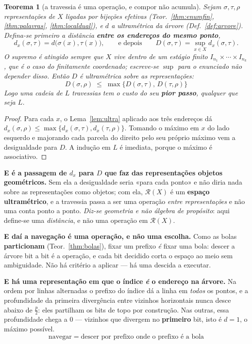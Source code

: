 \documentclass[11pt,a4paper]{article}
\newtheorem{teorema}{Teorema}
\begin{document}
\begin{teorema}[a travessia é uma operação, e compor não acumula]\label{thm:navega}
Sejam $\sigma,\tau,\rho$ representações de $X$ ligadas por bijeções efetivas
(Teor.~\ref{thm:enumfin}, \ref{thm:palavras}, \ref{thm:localdual}), e $d$ a
ultramétrica da árvore (Def.~\ref{def:arvore}). Defina-se primeiro a distância
\textbf{entre os endereços do mesmo ponto},
\[
d_x(\sigma,\tau)=d\bigl(\sigma(x),\tau(x)\bigr),
\qquad\text{e depois}\qquad
D(\sigma,\tau)=\sup_{x\in X} d_x(\sigma,\tau).
\]
\emph{O supremo é atingido sempre que $X$ vive dentro de um estágio finito
$I_{n_1}\times\cdots\times I_{n_k}$}, que é o caso do finitamente coordenado; escreve-se
$\sup$ para o enunciado não depender disso.
Então $D$ é ultramétrica sobre as representações:
\[
\boxed{\;D(\sigma,\rho)\;\le\;\max\bigl\{D(\sigma,\tau),\,D(\tau,\rho)\bigr\}\;}
\]
\emph{Logo uma cadeia de $L$ travessias tem o custo do seu \textbf{pior passo}},
qualquer que seja $L$.
\end{teorema}

\begin{proof}
Para cada $x$, o Lema~\ref{lem:ultra} aplicado aos três endereços dá
$d_x(\sigma,\rho)\le\max\{d_x(\sigma,\tau),d_x(\tau,\rho)\}$. Tomando o máximo em
$x$ do lado esquerdo e majorando cada parcela do direito pelo seu próprio máximo vem
a desigualdade para $D$. A indução em $L$ é imediata, porque o máximo é associativo.
\end{proof}

\noindent\textbf{E é a passagem de $d_x$ para $D$ que faz das representações objetos
geométricos.} Sem ela a desigualdade seria «para cada ponto» e não diria nada sobre as
representações como objetos; com ela, $\mathcal{R}(X)$ é um \textbf{espaço
ultramétrico}, e a travessia passa a ser uma operação \emph{entre representações} e não
uma conta ponto a ponto. \emph{Diz-se geometria e não álgebra de propósito}: aqui
define-se uma \emph{distância}, e não uma operação em $\mathcal{R}(X)$.

\noindent\textbf{E daí a navegação é uma operação, e não uma escolha.} Como as
bolas \textbf{particionam} (Teor.~\ref{thm:bolas}), fixar um prefixo \emph{é} fixar
uma bola: descer a árvore bit a bit é a operação, e cada bit decidido corta o espaço
ao meio sem ambiguidade. Não há critério a aplicar --- há uma descida a executar.

\medskip\noindent\textbf{E há uma representação em que o índice \emph{é} o endereço
na árvore.} Na ordem por linhas alternadas o prefixo do índice dá a linha em
\emph{todos} os pontos, e a profundidade da primeira divergência entre vizinhos
horizontais nunca desce abaixo de $\tfrac{p}{2}$: eles partilham os bits de topo por
construção. Nas outras, essa profundidade chega a $0$ --- vizinhos que divergem no
\textbf{primeiro} bit, isto é $d=1$, o máximo possível.
\[
\boxed{\;\text{navegar} \;=\; \text{descer por prefixo onde o prefixo é a bola}\;}
\]
\end{document}
